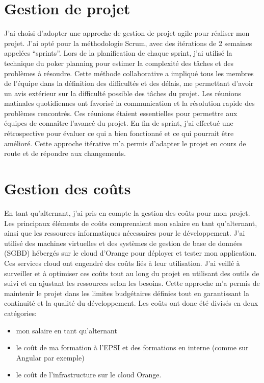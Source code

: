\documentclass[a4paper, 11pt]{report}
\begin{document}
\section{Gestion de projet}
J'ai choisi d'adopter une approche de gestion de projet agile pour
réaliser mon projet. J'ai opté pour la méthodologie Scrum, avec des
itérations de 2 semaines appelées ``sprints''.
\newline
Lors de la planification de chaque sprint, j'ai utilisé la technique du
poker planning pour estimer la complexité des tâches et des problèmes à
résoudre. Cette méthode collaborative a impliqué tous les membres de
l'équipe dans la définition des difficultés et des délais, me permettant
d'avoir un avis extérieur sur la difficulté possible des tâches du
projet.
\newline
Les réunions matinales quotidiennes ont favorisé la communication et la
résolution rapide des problèmes rencontrés. Ces réunions étaient
essentielles pour permettre aux équipes de connaître l'avancé du projet.
\newline
En fin de sprint, j'ai effectué une rétrospective pour évaluer ce qui a
bien fonctionné et ce qui pourrait être amélioré. Cette approche
itérative m'a permis d'adapter le projet en cours de route et de
répondre aux changements.
\section{Gestion des coûts}
En tant qu'alternant, j'ai pris en compte la gestion des coûts pour mon
projet. Les principaux éléments de coûts comprenaient mon salaire en
tant qu'alternant, ainsi que les ressources informatiques nécessaires
pour le développement. J'ai utilisé des machines virtuelles et des
systèmes de gestion de base de données (SGBD) hébergés sur le cloud
d'Orange pour déployer et tester mon application. Ces services cloud ont
engendré des coûts liés à leur utilisation. J'ai veillé à surveiller et
à optimiser ces coûts tout au long du projet en utilisant des outils de
suivi et en ajustant les ressources selon les besoins. Cette approche
m'a permis de maintenir le projet dans les limites budgétaires définies
tout en garantissant la continuité et la qualité du développement.
\newline
\newline
Les coûts ont donc été divisés en deux catégories:
\begin{itemize}
\tightlist
\item
  mon salaire en tant qu'alternant
\item
  le coût de ma formation à l'EPSI et des formations en interne (comme
  sur Angular par exemple)
\item
  le coût de l'infrastructure sur le cloud Orange.
\end{itemize}
\end{document}
